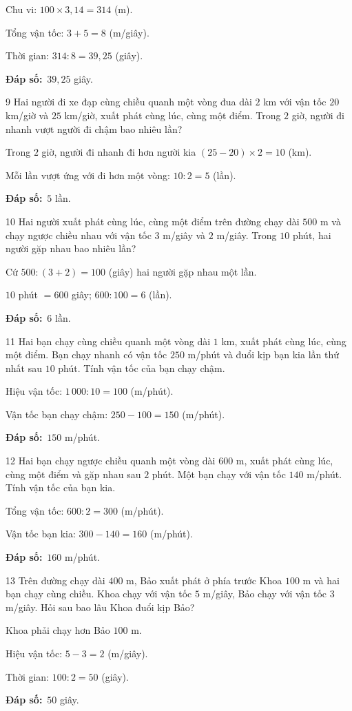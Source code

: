 \documentclass[11pt]{article}
\newif\ifsol \solfalse
\providecommand{\AnsWord}{Đáp số}
\newcommand{\dapso}[1]{\par\textbf{\AnsWord:}\ #1}
\newcommand{\probsol}[1]{%
  \begin{lrbox}{\solmeasure}\begin{minipage}{\dimexpr\linewidth-24pt\relax}#1\end{minipage}\end{lrbox}%
  \ifsol
    \begin{solbox}#1\end{solbox}%
  \else
    \setlength{\solht}{\dimexpr\ht\solmeasure+\dp\solmeasure+0.85cm\relax}%
    \ifdim\solht<1.35cm\setlength{\solht}{1.35cm}\fi
    \begin{tcolorbox}[colback=white,colframe=Line,boxrule=0.8pt,arc=5pt,
      left=8pt,right=8pt,top=4pt,bottom=4pt,height=\solht]{\footnotesize\color{Slate}\itshape\WorkWord}\end{tcolorbox}%
  \fi}
\newcommand{\gap}{\vspace{0.3cm}}
\def\WorkWord{Bài làm:}
\def\AnsWord{Đáp số}
\begin{document}
\probsol{
Chu vi: $100\times3{,}14=314$ (m).\par Tổng vận tốc: $3+5=8$ (m/giây).\par Thời gian: $314:8=39{,}25$ (giây).
\dapso{$39{,}25$ giây.}}
\gap
\begin{probbox}{9}{\relax}
Hai người đi xe đạp cùng chiều quanh một vòng đua dài $2$ km với vận tốc $20$ km/giờ và $25$ km/giờ, xuất phát cùng lúc, cùng một điểm. Trong $2$ giờ, người đi nhanh vượt người đi chậm bao nhiêu lần?
\end{probbox}
\probsol{
Trong $2$ giờ, người đi nhanh đi hơn người kia $(25-20)\times2=10$ (km).\par Mỗi lần vượt ứng với đi hơn một vòng: $10:2=5$ (lần).
\dapso{$5$ lần.}}
\gap
\begin{probbox}{10}{\relax}
Hai người xuất phát cùng lúc, cùng một điểm trên đường chạy dài $500$ m và chạy ngược chiều nhau với vận tốc $3$ m/giây và $2$ m/giây. Trong $10$ phút, hai người gặp nhau bao nhiêu lần?
\end{probbox}
\probsol{
Cứ $500:(3+2)=100$ (giây) hai người gặp nhau một lần.\par $10$ phút $=600$ giây; $600:100=6$ (lần).
\dapso{$6$ lần.}}
\gap
\begin{probbox}{11}{\relax}
Hai bạn chạy cùng chiều quanh một vòng dài $1$ km, xuất phát cùng lúc, cùng một điểm. Bạn chạy nhanh có vận tốc $250$ m/phút và đuổi kịp bạn kia lần thứ nhất sau $10$ phút. Tính vận tốc của bạn chạy chậm.
\end{probbox}
\probsol{
Hiệu vận tốc: $1\,000:10=100$ (m/phút).\par Vận tốc bạn chạy chậm: $250-100=150$ (m/phút).
\dapso{$150$ m/phút.}}
\gap
\begin{probbox}{12}{\relax}
Hai bạn chạy ngược chiều quanh một vòng dài $600$ m, xuất phát cùng lúc, cùng một điểm và gặp nhau sau $2$ phút. Một bạn chạy với vận tốc $140$ m/phút. Tính vận tốc của bạn kia.
\end{probbox}
\probsol{
Tổng vận tốc: $600:2=300$ (m/phút).\par Vận tốc bạn kia: $300-140=160$ (m/phút).
\dapso{$160$ m/phút.}}
\gap
\begin{probbox}{13}{\relax}
Trên đường chạy dài $400$ m, Bảo xuất phát ở phía trước Khoa $100$ m và hai bạn chạy cùng chiều. Khoa chạy với vận tốc $5$ m/giây, Bảo chạy với vận tốc $3$ m/giây. Hỏi sau bao lâu Khoa đuổi kịp Bảo?
\end{probbox}
\probsol{
Khoa phải chạy hơn Bảo $100$ m.\par Hiệu vận tốc: $5-3=2$ (m/giây).\par Thời gian: $100:2=50$ (giây).
\dapso{$50$ giây.}}
\end{document}
